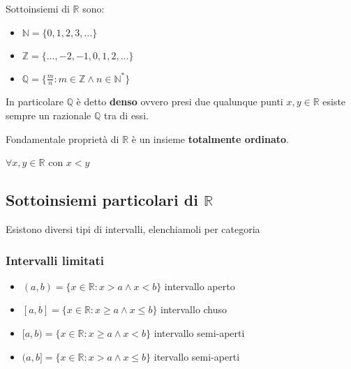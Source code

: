 \documentclass[main.tex]{subfiles}
\begin{document}
Sottoinsiemi di $ \mathbb{R} $ sono:
\begin{itemize}
        \item $ \mathbb{N} = \{0,1,2,3,\ldots\} $
        \item $ \mathbb{Z} = \{\ldots,-2,-1,0,1,2,\ldots\} $
        \item $ \mathbb{Q} = \{\frac{m}{n}: m \in \mathbb{Z} \wedge n \in \mathbb{N}^*\} $
\end{itemize}

\begin{tcolorbox}
       \begin{oss}
        In particolare $ \mathbb{Q} $ è detto \textbf{denso} ovvero  presi due qualunque punti $ x,y \in \mathbb{R} $ esiste sempre un razionale $ \mathbb{Q}  $ tra di essi.
       \end{oss} 
\end{tcolorbox}


\begin{tcolorbox}
\begin{prop}
Fondamentale proprietà di $ \mathbb{R} $ è un insieme \textbf{totalmente ordinato}.
\end{prop}
\end{tcolorbox}

\begin{lemma}
       $ \forall x,y \in \mathbb{R} $ con $ x < y $ 
\end{lemma}


\subsection{Sottoinsiemi particolari di $\mathbb{R}$}\label{sec:sottoinsiemi_particolari_di_R}

Esistono diversi tipi di intervalli, elenchiamoli per categoria


\subsubsection{Intervalli limitati}
\begin{itemize}
        \item $ (a,b) = \{x \in \mathbb{R} : x>a \wedge x<b\} $ intervallo aperto
        \item $ [a,b] = \{x \in \mathbb{R} : x\ge a \wedge x\le b\} $ intervallo chuso
        \item $ [a,b) = \{x \in \mathbb{R} : x\ge a \wedge x<b\} $ intervallo semi-aperti
        \item $ (a,b] = \{x \in \mathbb{R} : x>a \wedge x\le b\} $ itervallo semi-aperti
\end{itemize}
\end{document}
